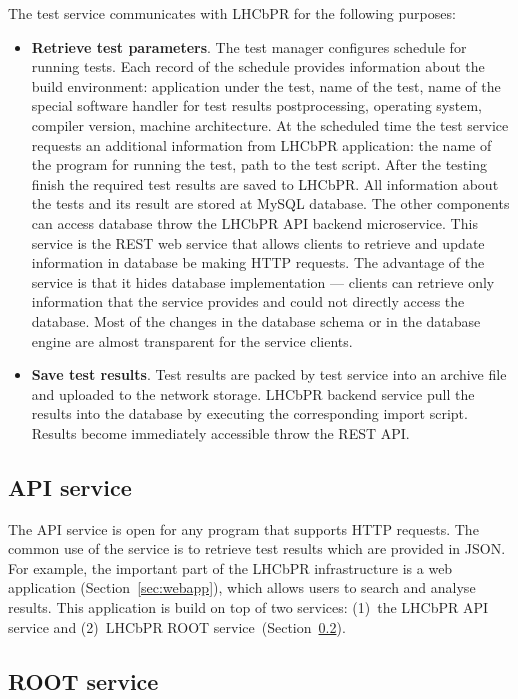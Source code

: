 \documentclass[a4paper]{jpconf}
\begin{document}
The test service communicates with LHCbPR for the following purposes:
\begin{itemize}
\item \textbf{Retrieve test parameters}. The test manager configures schedule
for running tests. Each record of the schedule provides information about the
build environment: application under the test, name of the test, name of the
special software handler for test results postprocessing, operating system,
compiler version, machine architecture. At the scheduled time the test service
requests an additional information from LHCbPR application: the name of the
program for running the test, path to the test script. After the testing finish
the required  test results are saved to LHCbPR. All information about the tests
and its result are stored at MySQL database. The other components can access
database throw the LHCbPR API backend microservice. This service is the REST web
service that allows clients to retrieve and update information in database be making
HTTP requests. The advantage of the service is that it hides database
implementation --- clients can retrieve only information that the service provides
and could not directly access the database. Most of the changes in the database schema
or in the database engine are almost transparent for the service clients.

\item \textbf{Save test results}. Test results are packed by test service into
an archive file and uploaded to the network storage. LHCbPR backend service pull
the results into the database by executing the corresponding import script.
Results become immediately accessible throw the REST API.
\end{itemize}

\subsection{API  service}
The API service is open for any program that supports HTTP
requests. The common use of the service is to retrieve test results which are
provided in JSON. For example, the important part of the LHCbPR
infrastructure is a web application (Section~\ref{sec:webapp}), which allows users
to search and analyse results. This
application is build on top of two services: (1)~the LHCbPR API service
and (2)~LHCbPR ROOT service~(Section~\ref{sec:rootapp}). 


\subsection{ROOT service}\label{sec:rootapp}
\end{document}
